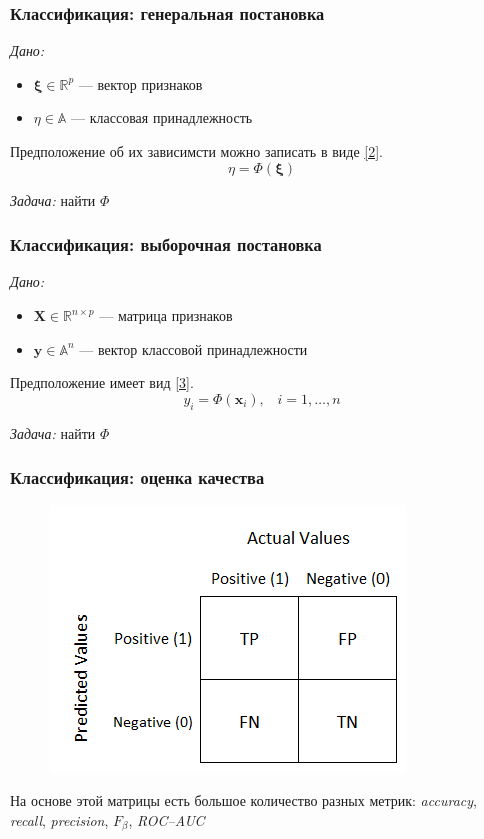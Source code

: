 \documentclass[11pt]{beamer}
\begin{document}
	\begin{frame}
		\frametitle{Классификация: генеральная постановка}
		\textit{Дано:}
		\begin{itemize}
			\item $\bm{\xi} \in \mathbb{R}^p$ --- вектор признаков
			\item $\eta \in \mathbb{A}$ --- классовая принадлежность
		\end{itemize}
	
		Предположение об их зависимсти можно записать в виде \ref{2}.
		\begin{equation}
			\eta = \Phi(\bm{\xi})
			\label{2}
		\end{equation}
		
		\textit{Задача:} найти $\Phi$
	\end{frame}
	\begin{frame}
		\frametitle{Классификация: выборочная постановка}
		\textit{Дано:}
		\begin{itemize}
			\item $\bm{X} \in \mathbb{R}^{n\times p}$ --- матрица признаков
			\item $\bm{y} \in \mathbb{A}^n$ --- вектор классовой принадлежности
		\end{itemize}
		
		Предположение имеет вид \ref{3}.
		\begin{equation}
			y_i = \Phi(\bm{x}_i),\;\;\; i = 1, \ldots, n
			\label{3}
		\end{equation}
		
		\textit{Задача:} найти $\Phi$
	\end{frame}
	\begin{frame}
		\frametitle{Классификация: оценка качества}
		\begin{figure}
			\includegraphics[width=0.3\linewidth]{imgs/conf_matrix}
		\end{figure}
	    На основе этой матрицы есть большое количество разных метрик: \textit{accuracy}, \textit{recall}, \textit{precision}, $F_\beta$, \textit{ROC--AUC}
	\end{frame}
\end{document}
